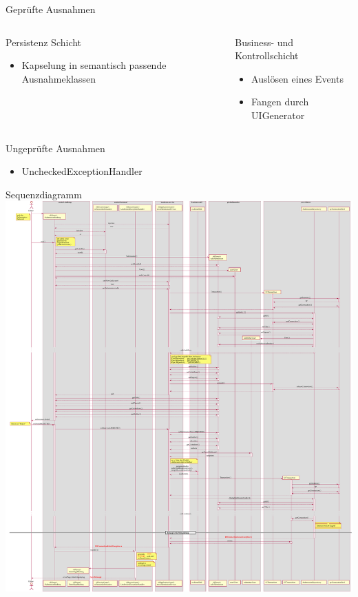 \documentclass{beamer}
\begin{document}
    \begin{frame}{Geprüfte Ausnahmen}
        \pause
        \begin{columns}
            \begin{column}{.48\textwidth}
                Persistenz Schicht
                \begin{itemize}
                    \item Kapselung in semantisch passende Ausnahmeklassen
                \end{itemize}
            \end{column}
            \pause
            \begin{column}{.48\textwidth}
                Business- und Kontrollschicht
                \begin{itemize}
                    \item Auslösen eines Events
                    \item Fangen durch UIGenerator
                \end{itemize}
            \end{column}
        \end{columns}
    \end{frame}

    \begin{frame}{Ungeprüfte Ausnahmen}
        \begin{itemize}
            \item UncheckedExceptionHandler
        \end{itemize}
    \end{frame}

    \begin{frame}{Sequenzdiagramm}
        \centering
        \includegraphics[height=0.9\textheight]{../../docs/Entwurf/graphics/reject_submission.pdf}
    \end{frame}
    
\end{document}
